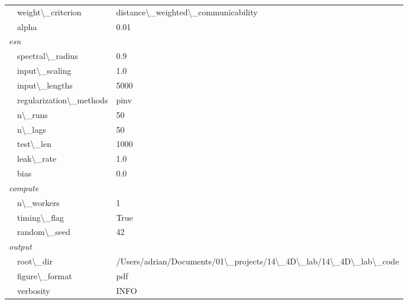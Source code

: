 \documentclass{article}
\begin{document}
\begin{longtable}{ll}
~~weight\textbackslash{}_criterion & distance\textbackslash{}_weighted\textbackslash{}_communicability \\
~~alpha & 0.01 \\
\multicolumn{2}{l}{\textit{esn}} \\
~~spectral\textbackslash{}_radius & 0.9 \\
~~input\textbackslash{}_scaling & 1.0 \\
~~input\textbackslash{}_lengths & 5000 \\
~~regularization\textbackslash{}_methods & pinv \\
~~n\textbackslash{}_runs & 50 \\
~~n\textbackslash{}_lags & 50 \\
~~test\textbackslash{}_len & 1000 \\
~~leak\textbackslash{}_rate & 1.0 \\
~~bias & 0.0 \\
\multicolumn{2}{l}{\textit{compute}} \\
~~n\textbackslash{}_workers & 1 \\
~~timing\textbackslash{}_flag & True \\
~~random\textbackslash{}_seed & 42 \\
\multicolumn{2}{l}{\textit{output}} \\
~~root\textbackslash{}_dir & /Users/adrian/Documents/01\textbackslash{}_projects/14\textbackslash{}_4D\textbackslash{}_lab/14\textbackslash{}_4D\textbackslash{}_lab\textbackslash{}_code \\
~~figure\textbackslash{}_format & pdf \\
~~verbosity & INFO \\
\end{longtable}
\end{document}

